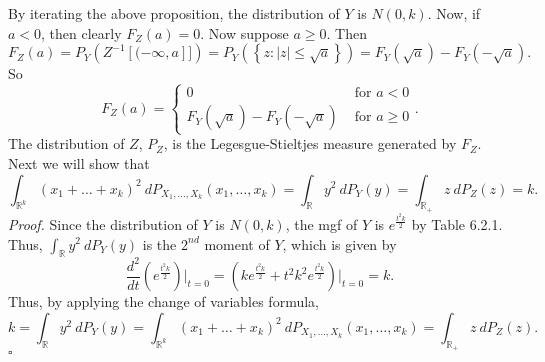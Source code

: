 \documentclass[12pt]{article}
\newcounter{ProofCounter}
\newenvironment{Proof}{\stepcounter{ProofCounter}\textit{Proof.}}{\hfill$\square$}
\begin{document}
\begin{enumerate}[label=(\alph*)]
By iterating the above proposition, the distribution of $Y$ is $N(0,k)$. Now, if $a < 0$, then clearly $F_{Z}(a) = 0$. Now suppose $a \geq 0$. Then 
\[ F_{Z}(a) = P_{Y}\left( Z^{-1}[(-\infty, a]] \right) = P_{Y}\left( \left\{ z : |z| \leq \sqrt{a} \right\} \right) = F_{Y}(\sqrt{a}) -
F_{Y}(-\sqrt{a}). \]
So 
\[ F_{Z}(a) = \left\{ \begin{array}{cl}
0 & \text{ for } a < 0 \\
F_{Y}(\sqrt{a}) - F_{Y}(-\sqrt{a}) & \text{ for } a \geq 0 
\end{array} \right. .\]
The distribution of $Z$, $P_{Z}$, is the Legesgue-Stieltjes measure generated by $F_{Z}$. Next we will show that 
\[ \int_{\mathbb{R}^{k}}(x_{1} + \dots + x_{k})^{2}\ dP_{X_{1}, \hdots, X_{k}}(x_{1}, \hdots, x_{k}) = \int_{\mathbb{R}}y^{2}\ dP_{Y}(y) =
\int_{\mathbb{R}_{+}}z \ dP_{Z}(z) = k.\]
\begin{Proof}
Since the distribution of $Y$ is $N(0,k)$, the mgf of $Y$ is $e^{\frac{t^{2}k}{2}}$ by Table 6.2.1. Thus, 
$\int_{\mathbb{R}}y^{2}\ dP_{Y}(y)$ is the $2^{nd}$ moment of $Y$, which is given by 
\[ \frac{d^{2}}{dt} \left( e^{\frac{t^{2}k}{2}}\right)\bigg|_{t=0} = \left( ke^{\frac{t^{2}k}{2}} + t^{2}k^{2}e^{\frac{t^{2}k}{2}} \right)\bigg|_{t=0} = k. \]
Thus, by applying the change of variables formula, 
\[ k = \int_{\mathbb{R}}y^{2}\ dP_{Y}(y) = \int_{\mathbb{R}^{k}}(x_{1} + \dots + x_{k})^{2}\ dP_{X_{1}, \hdots, X_{k}}(x_{1}, \hdots, x_{k}) = 
\int_{\mathbb{R}_{+}}z \ dP_{Z}(z).\]
\end{Proof}


\end{enumerate}
\end{document}
